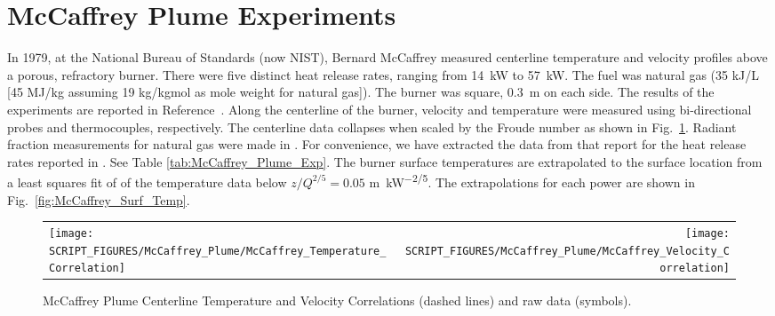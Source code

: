 \FloatBarrier


\section{McCaffrey Plume Experiments}
\label{McCaffrey_Plume_Description}

In 1979, at the National Bureau of Standards (now NIST), Bernard McCaffrey measured centerline temperature and velocity profiles above a porous, refractory burner. There were five distinct heat release rates, ranging from 14~kW to 57~kW. The fuel was natural gas (35 kJ/L [45 MJ/kg assuming 19 kg/kgmol as mole weight for natural gas]). The burner was square, 0.3~m on each side. The results of the experiments are reported in Reference~\cite{McCaffrey:NBSIR_79-1910}. Along the centerline of the burner, velocity and temperature were measured using bi-directional probes and thermocouples, respectively.  The centerline data collapses when scaled by the Froude number as shown in Fig.~\ref{fig:McCaffrey_Correlations}. Radiant fraction measurements for natural gas were made in \cite{McCaffrey:1981}.  For convenience, we have extracted the data from that report for the heat release rates reported in \cite{McCaffrey:NBSIR_79-1910}.  See Table \ref{tab:McCaffrey_Plume_Exp}.  The burner surface temperatures are extrapolated to the surface location from a least squares fit of of the temperature data below $z/Q^{2/5} = 0.05$ \si{m.kW^{-2/5}}.  The extrapolations for each power are shown in Fig.~\ref{fig:McCaffrey_Surf_Temp}.

\begin{figure}[!ht]
\begin{tabular*}{\textwidth}{l@{\extracolsep{\fill}}r}
\texttt{[image: SCRIPT\_FIGURES/McCaffrey\_Plume/McCaffrey\_Temperature\_Correlation]} &
\texttt{[image: SCRIPT\_FIGURES/McCaffrey\_Plume/McCaffrey\_Velocity\_Correlation]} \\
\end{tabular*}
\caption[McCaffrey Plume Centerline Temperature and Velocity Correlations]
{McCaffrey Plume Centerline Temperature and Velocity Correlations (dashed lines) and raw data (symbols).}
\label{fig:McCaffrey_Correlations}
\end{figure}

